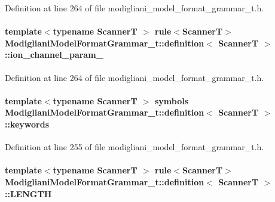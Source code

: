 Definition at line 264 of file modigliani\_\-model\_\-format\_\-grammar\_\-t.h.

\paragraph[{ion\_\-channel\_\-param\_\-}]{\setlength{\rightskip}{0pt plus 5cm}template$<$typename ScannerT $>$ rule$<$ScannerT$>$ {\bf ModiglianiModelFormatGrammar\_\-t::definition}$<$ ScannerT $>$::{\bf ion\_\-channel\_\-param\_\-}}\hfill\label{struct_modigliani_model_format_grammar__t_1_1definition_aaa9b07bff73295fff68db298a2a4b1b1}


Definition at line 264 of file modigliani\_\-model\_\-format\_\-grammar\_\-t.h.

\paragraph[{keywords}]{\setlength{\rightskip}{0pt plus 5cm}template$<$typename ScannerT $>$ symbols {\bf ModiglianiModelFormatGrammar\_\-t::definition}$<$ ScannerT $>$::{\bf keywords}}\hfill\label{struct_modigliani_model_format_grammar__t_1_1definition_ae3fe0c65888e077989c52e7a997482fc}


Definition at line 255 of file modigliani\_\-model\_\-format\_\-grammar\_\-t.h.

\paragraph[{LENGTH}]{\setlength{\rightskip}{0pt plus 5cm}template$<$typename ScannerT $>$ rule$<$ScannerT$>$ {\bf ModiglianiModelFormatGrammar\_\-t::definition}$<$ ScannerT $>$::{\bf LENGTH}}\hfill\label{struct_modigliani_model_format_grammar__t_1_1definition_ae8c8426598b804f2c02ee2b65a86a36e}



